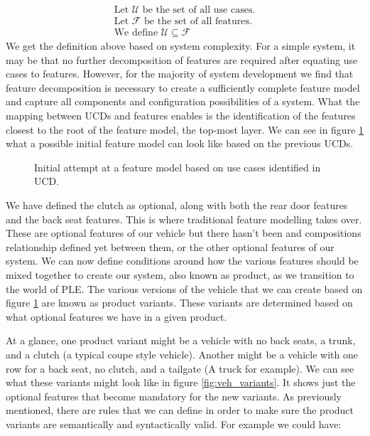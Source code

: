 \begin{gather}
	\text{Let } \mathcal{U} \text{ be the set of all use cases.}\\
	\text{Let } \mathcal{F} \text{ be the set of all features.}\\
	\text{We define } \mathcal{U} \subseteq \mathcal{F} 
\end{gather}
We get the definition above based on system complexity. For a simple system, it may be that no further decomposition of features are required after equating use cases to features. However, for the majority of system development we find that feature decomposition is necessary to create a sufficiently complete feature model and capture all components and configuration possibilities of a system. What the mapping between \ac{UCD}s and features enables is the identification of the features closest to the root of the feature model, the top-most layer. We can see in figure \ref{fig:FM_init} what a possible initial feature model can look like based on the previous \ac{UCD}s.

\begin{figure}
	\centering
	
	\caption{Initial attempt at a feature model based on use cases identified in \ac{UCD}.}
	\label{fig:FM_init}
\end{figure}

%	

We have defined the clutch as optional, along with both the rear door features and the back seat features. This is where traditional feature modelling takes over. These are optional features of our vehicle but there hasn't been and compositions relationship defined yet between them, or the other optional features of our system. We can now define conditions around how the various features should be mixed together to create our system, also known as product, as we transition to the world of \ac{PLE}. The various versions of the vehicle that we can create based on figure \ref{fig:FM_init} are known as product variants. These variants are determined based on what optional features we have in a given product.

At a glance, one product variant might be a vehicle with no back seats, a trunk, and a clutch (a typical coupe style vehicle). Another might be a vehicle with one row for a back seat, no clutch, and a tailgate (A truck for example). We can see what these variants might look like in figure \ref{fig:veh_variants}. It shows just the optional features that become mandatory for the new variants. As previously mentioned, there are rules that we can define in order to make sure the product variants are semantically and syntactically valid. For example we could have:


